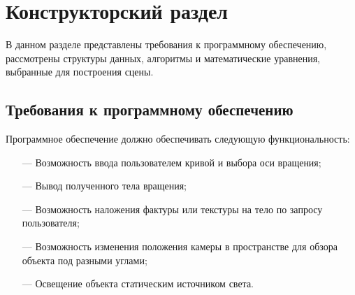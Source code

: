 \chapter{Конструкторский раздел}
В данном разделе представлены требования к программному обеспечению, рассмотрены структуры данных, алгоритмы и математические уравнения, выбранные для построения сцены.

\section{Требования к программному обеспечению}
Программное обеспечение должно обеспечивать следующую функциональность:
\begin{itemize}
    \item[---] Возможность ввода пользователем кривой и выбора оси вращения;
    \item[---] Вывод полученного тела вращения;
    \item[---] Возможность наложения фактуры или текстуры на тело по запросу пользователя;
    \item[---] Возможность изменения положения камеры в пространстве для обзора объекта под разными углами;
    \item[---] Освещение объекта статическим источником света.
\end{itemize}

